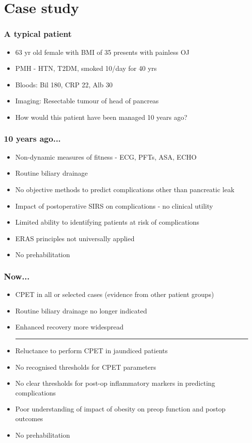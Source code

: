 \documentclass{beamer}
\begin{document}
\section{Case study}
\begin{frame}
	\frametitle{A typical patient}
	\begin{itemize}
		\item 63 yr old female with BMI of 35 presents with painless OJ
		\item PMH - HTN, T2DM, smoked 10/day for 40 yrs
		\item Bloods: Bil 180, CRP 22, Alb 30
		\item Imaging: Resectable tumour of head of pancreas
		\item How would this patient have been managed 10 years ago?
	\end{itemize}
\end{frame}

\begin{frame}
	\frametitle{10 years ago...}
	\begin{itemize}
		\item Non-dynamic measures of fitness - ECG, PFTs, ASA, ECHO
		\item Routine biliary drainage
		\item No objective methods to predict complications other than pancreatic leak
		\item Impact of postoperative SIRS on complications - no clinical utility
		\item Limited ability to identifying patients at risk of complications
		\item ERAS principles not universally applied
		\item No prehabilitation
	\end{itemize}
\end{frame}

\begin{frame}
	\frametitle{Now... }
	\begin{itemize}
		\item CPET in all or selected cases (evidence from other patient groups)
		\item Routine biliary drainage no longer indicated
		\item Enhanced recovery more widespread
		\medskip
		\hrule
		\medskip
		\item Reluctance to perform CPET in jaundiced patients
		\item No recognised thresholds for CPET parameters
		\item No clear thresholds for post-op inflammatory markers in predicting complications
		\item Poor understanding of impact of obesity on preop function and postop outcomes
		\item No prehabilitation
	\end{itemize}
\end{frame}
\end{document}
